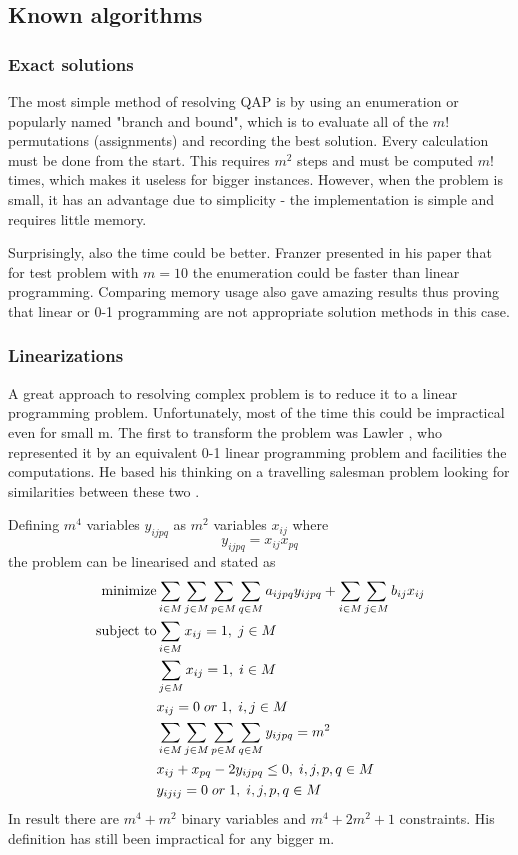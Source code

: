\subsection{Known algorithms}
\subsubsection{Exact solutions}

The most simple method of resolving QAP is by using an enumeration or popularly named "branch and bound", which is to evaluate all of the $m!$ permutations (assignments) and recording the best solution.
Every calculation must be done from the start.
This requires $m^2$ steps and must be computed $m!$ times, which makes it useless for bigger instances.
However, when the problem is small, it has an advantage due to simplicity - the implementation is simple and requires little memory.

Surprisingly, also the time could be better. Franzer presented in his paper \cite{frazer1997602} that for test problem with $m=10$ the enumeration could be faster than linear programming. Comparing memory usage also gave amazing results thus proving that linear or 0-1 programming are not appropriate solution methods in this case.

\subsubsection{Linearizations}
A great approach to resolving complex problem is to reduce it to a linear programming problem.
Unfortunately, most of the time this could be impractical even for small m.
The first to transform the problem was Lawler \cite{lawler1963}, who represented it by an equivalent 0-1 linear programming problem and facilities the computations. He based his thinking on a travelling salesman problem looking for similarities between these two \cite{charnsethikul1988exact}.

Defining $m^4$ variables $y_{ijpq}$ as $m^2$ variables $x_{ij}$ where
\begin{equation}
y_{ijpq} = x_{ij}x_{pq}
\end{equation}
the problem can be linearised and stated as
\begin{align}
  \text{minimize} &\null \sum_{i \in M} \sum_{j \in M} \sum_{p \in M} \sum_{q \in M} a_{ijpq}y_{ijpq} + \sum_{i \in M} \sum_{j \in M} b_{ij} x_{ij} \\
  \text{subject to} &\null \sum_{i \in M} x_{ij} = 1, \; j \in M \\
  &\null \sum_{j \in M} x_{ij} = 1, \; i \in M \\
  &\null x_{ij} = 0 \; or \; 1, \; i, j \in M \\
  &\null \sum_{i \in M} \sum_{j \in M} \sum_{p \in M} \sum_{q \in M} y_{ijpq} = m^2 \; \\
  &\null x_{ij} + x_{pq} - 2y_{ijpq} \leq 0, \; i, j, p, q \in M \\
  &\null y_{ijij} = 0 \; or \; 1, \; i, j, p, q \in M \\
\end{align}
In result there are $m^4 + m^2$ binary variables and $m^4 + 2 m^2 + 1$ constraints.
His definition has still been impractical for any bigger m.

